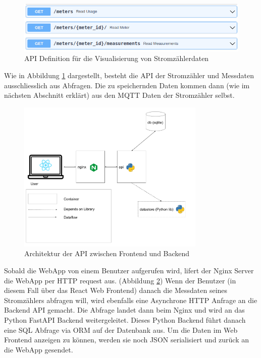 \begin{figure}[h]
    \centering
    \includegraphics[width=1.0\textwidth]{gfx/api-visualization}
    \caption{
        \ac{API} Definition für die Visualisierung von Stromzählerdaten
    }
    \label{fig:api-visualization}
\end{figure}

Wie in Abbildung \ref{fig:api-visualization} dargestellt, besteht die \ac{API} der Stromzähler
und Messdaten ausschliesslich aus Abfragen. Die zu speichernden Daten kommen dann (wie im nächsten
Abschnitt erklärt) aus den \ac{MQTT} Daten der Stromzähler selbst.

\begin{figure}[h]
    \centering
    \includegraphics[width=0.8\textwidth]{gfx/sim-arch-api}
    \caption{
        Architektur der \ac{API} zwischen Frontend und Backend
    }
    \label{fig:arch-visualization-front-back}
\end{figure}

Sobald die WebApp von einem Benutzer aufgerufen wird, lifert der Nginx Server
die WebApp per \ac{HTTP} request aus. (Abbildung \ref{fig:arch-visualization-front-back})
Wenn der Benutzer (in diesem Fall über das React Web Frontend) danach die Messdaten seines
Stromzählers abfragen will, wird ebenfalls eine Asynchrone \ac{HTTP} Anfrage an die Backend \ac{API} gemacht.
Die Abfrage landet dann beim Nginx und wird an das Python FastAPI Backend weitergeleitet.
Dieses Python Backend führt danach eine SQL Abfrage via \ac{ORM} auf der Datenbank aus.
Um die Daten im Web Frontend anzeigen zu können, werden sie noch \ac{JSON} serialisiert
und zurück an die WebApp gesendet.

